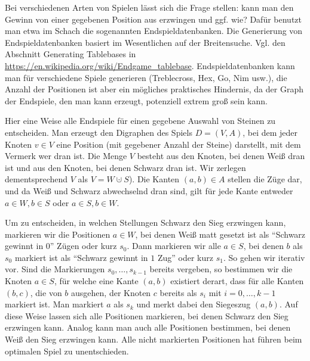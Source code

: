 \begin{bem}  		
		Bei verschiedenen Arten von Spielen lässt sich die Frage stellen: kann man den Gewinn von einer gegebenen Position aus erzwingen und ggf. wie? Dafür benutzt man etwa im Schach die sogenannten Endspieldatenbanken. 
		Die Generierung von Endspieldatenbanken basiert im Wesentlichen auf der Breitensuche. Vgl. den Abschnitt Generating Tablebases in  \url{https://en.wikipedia.org/wiki/Endgame_tablebase}. Endspieldatenbanken kann man für verschiedene Spiele generieren (Treblecross, Hex, Go, Nim usw.), die Anzahl der Positionen ist aber ein mögliches praktisches Hindernis, da der Graph der Endspiele, den man kann erzeugt, potenziell extrem groß sein kann.   
		
		Hier eine Weise alle Endspiele für einen gegebene Auswahl von Steinen zu entscheiden. Man erzeugt den Digraphen des Spiels $D=(V,A)$, bei dem jeder Knoten $v \in V$ eine Position (mit gegebener Anzahl der Steine) darstellt, mit dem Vermerk wer dran ist. Die Menge $V$ besteht aus den Knoten, bei denen Weiß dran ist und aus den Knoten, bei denen Schwarz dran ist. Wir zerlegen dementsprechend $V$ als $V = W \cupdot S$). Die Kanten $(a,b) \in A $ stellen die Züge dar, und da Weiß und Schwarz abwechselnd dran sind, gilt für jede Kante entweder  $a \in W, b \in S$ oder $a \in S, b \in W$. 
		
		Um zu entscheiden, in welchen Stellungen Schwarz den Sieg erzwingen kann, markieren wir die Positionen $a \in W$, bei denen Weiß matt gesetzt ist als ``Schwarz gewinnt in $0$'' Zügen oder kurz $s_0$. Dann markieren wir alle $a \in S$, bei denen $b$ als $s_0$ markiert ist als ``Schwarz gewinnt in $1$ Zug'' oder kurz $s_1$. So gehen wir iterativ vor. Sind die Markierungen $s_0,\ldots,s_{k-1}$ bereits vergeben, so bestimmen wir die Knoten $a \in S$, für welche eine Kante $(a,b)$ existiert derart, dass für alle Kanten $(b,c)$, die von $b$ ausgehen, der Knoten $c$ bereits als $s_i$ mit $i=0,\ldots,k-1$ markiert ist. Man markiert $a$ als $s_k$ und merkt dabei den Siegeszug $(a,b)$. Auf diese Weise lassen sich alle Positionen markieren, bei denen Schwarz den Sieg erzwingen kann. Analog kann man auch alle Positionen bestimmen, bei denen Weiß den Sieg erzwingen kann. Alle nicht markierten  Positionen hat führen beim optimalen Spiel zu unentschieden. 
\end{bem} 

